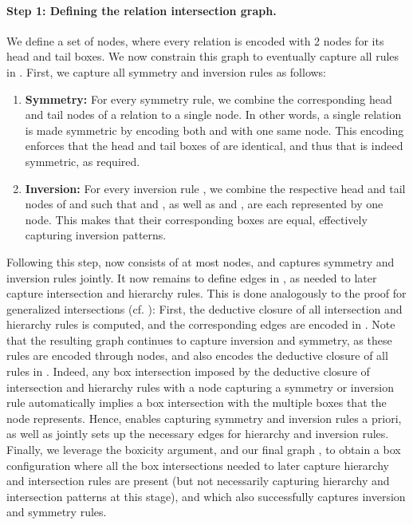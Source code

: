 \documentclass{article}
\begin{document}
\paragraph{Step 1: Defining the relation intersection graph.} We define a set of  nodes, where every relation is encoded with 2 nodes for its head and tail boxes. We now constrain this graph to eventually capture all rules in . First, we capture all symmetry and inversion rules as follows:
\begin{enumerate}
    \item \textbf{Symmetry:} For every symmetry rule, we combine the corresponding head and tail nodes of a relation  to a single node. In other words, a single relation   is made symmetric by encoding both  and  with one same node. This encoding enforces that the head and tail boxes of  are identical, and thus that  is indeed symmetric, as required. 
    \item \textbf{Inversion:} For every inversion rule , we combine the respective head and tail nodes of  and  such that  and , as well as  and , are each represented by one node. This makes that their corresponding boxes are equal, effectively capturing inversion patterns. 
\end{enumerate}

Following this step,  now consists of at most  nodes, and captures symmetry and inversion rules jointly. It now remains to define edges in , as needed to later capture intersection and hierarchy rules. This is done analogously to the proof for generalized intersections (cf. ): First, the deductive closure of all intersection and hierarchy rules is computed, and the corresponding edges are encoded in . Note that the resulting graph  continues to capture inversion and symmetry, as these rules are encoded through nodes, and also encodes the deductive closure of all rules in . Indeed, any box intersection imposed by the deductive closure of intersection and hierarchy rules with a node capturing a symmetry or inversion rule automatically implies a box intersection with the multiple boxes that the node represents. Hence,  enables capturing symmetry and inversion rules a priori, as well as jointly sets up the necessary edges for hierarchy and inversion rules. Finally, we leverage the boxicity argument, and our final graph , to obtain a box configuration where all the box intersections needed to later capture hierarchy and intersection rules are present (but not necessarily capturing hierarchy and intersection patterns at this stage), and which also successfully captures inversion and symmetry rules. 
\end{document}
